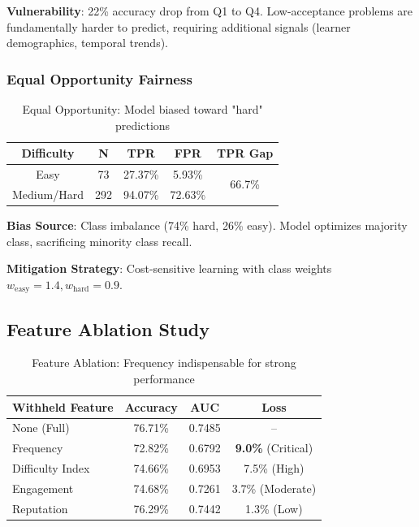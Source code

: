\documentclass[conference]{IEEEtran}
\begin{document}
\textbf{Vulnerability}: 22\% accuracy drop from Q1 to Q4. Low-acceptance problems are fundamentally harder to predict, requiring additional signals (learner demographics, temporal trends).

\subsubsection{Equal Opportunity Fairness}

\begin{table}[h]
\centering
\small
\begin{tabular}{c|c|c|c|c}
\toprule
\textbf{Difficulty} & \textbf{N} & \textbf{TPR} & \textbf{FPR} & \textbf{TPR Gap} \\
\midrule
Easy & 73 & 27.37\% & 5.93\% & \multirow{2}{*}{66.7\%} \\
Medium/Hard & 292 & 94.07\% & 72.63\% & \\
\bottomrule
\end{tabular}
\caption{Equal Opportunity: Model biased toward "hard" predictions}
\label{tab:fairness}
\end{table}

\textbf{Bias Source}: Class imbalance (74\% hard, 26\% easy). Model optimizes majority class, sacrificing minority class recall.

\textbf{Mitigation Strategy}: Cost-sensitive learning with class weights $w_{\text{easy}} = 1.4, w_{\text{hard}} = 0.9$.

\subsection{Feature Ablation Study}

\begin{table}[h]
\centering
\small
\begin{tabular}{l|c|c|c}
\toprule
\textbf{Withheld Feature} & \textbf{Accuracy} & \textbf{AUC} & \textbf{Loss} \\
\midrule
None (Full) & 76.71\% & 0.7485 & -- \\
Frequency & 72.82\% & 0.6792 & \textbf{9.0\%} (Critical) \\
Difficulty Index & 74.66\% & 0.6953 & 7.5\% (High) \\
Engagement & 74.68\% & 0.7261 & 3.7\% (Moderate) \\
Reputation & 76.29\% & 0.7442 & 1.3\% (Low) \\
\bottomrule
\end{tabular}
\caption{Feature Ablation: Frequency indispensable for strong performance}
\label{tab:ablation}
\end{table}
\end{document}
